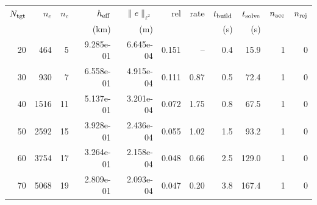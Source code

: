 \begin{tabular}{rrrrrrrrrrr}
\hline
$N_{\rm tgt}$ & $n_e$ & $n_c$ & $h_{\rm eff}$ & $\|e\|_{\ell^2}$ & rel & rate & $t_{\rm build}$ & $t_{\rm solve}$ & $n_{\rm acc}$ & $n_{\rm rej}$ \\
 & & & (km) & (m) & & & (s) & (s) & & \\
\hline
20 & 464 & 5 & 9.285e-01 & 6.645e-04 & 0.151 & -- & 0.4 & 15.9 & 1 & 0 \\
30 & 930 & 7 & 6.558e-01 & 4.915e-04 & 0.111 & 0.87 & 0.5 & 72.4 & 1 & 0 \\
40 & 1516 & 11 & 5.137e-01 & 3.201e-04 & 0.072 & 1.75 & 0.8 & 67.5 & 1 & 0 \\
50 & 2592 & 15 & 3.928e-01 & 2.436e-04 & 0.055 & 1.02 & 1.5 & 93.2 & 1 & 0 \\
60 & 3754 & 17 & 3.264e-01 & 2.158e-04 & 0.048 & 0.66 & 2.5 & 129.0 & 1 & 0 \\
70 & 5068 & 19 & 2.809e-01 & 2.093e-04 & 0.047 & 0.20 & 3.8 & 167.4 & 1 & 0 \\
\hline
\end{tabular}
